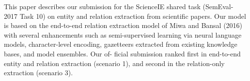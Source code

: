 This paper describes our submission for the ScienceIE shared task (SemEval- 2017 Task 10) on entity and relation extraction from scientific papers. Our model is based on the end-to-end relation extraction model of Miwa and Bansal (2016) with several enhancements such as semi-supervised learning via neural language models, character-level encoding, gazetteers extracted from existing knowledge bases, and model ensembles. Our of- ficial submission ranked first in end-to-end entity and relation extraction (scenario 1), and second in the relation-only extraction (scenario 3).
